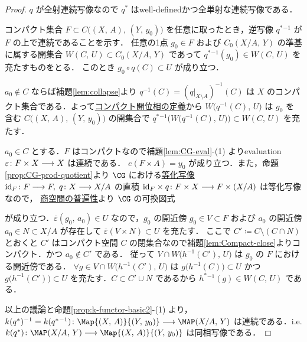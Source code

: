 \documentclass[algtopo_main]{subfiles}
\begin{document}
\begin{proof}
    $q$ が全射連続写像なので $q^*$ はwell-definedかつ全単射な連続写像である．
    
    コンパクト集合 $F \subset C \bigl( (X,\, A),\, (Y,\, y_0) \bigr)$ を任意に取ったとき，逆写像 $q^*{}^{-1}$ が $F$ の上で連続であることを示す．
    任意の1点 $g_0 \in F$ および $C_0(X/A,\, Y)$ の準基に属する開集合 $W(C,\, U) \subset C_0(X/A,\, Y)$ であって $q^*{}^{-1}(g_0) \in W(C,\, U)$ を充たすものをとる．
    このとき $g_0 \circ q(C) \subset U$ が成り立つ．
    
    $a_0 \notin C$ ならば補題\ref{lem:collapse}より $q^{-1}(C) = (q|_{X \setminus A})^{-1}(C)$ は $X$ のコンパクト集合である．よって\hyperref[def:compact-open]{コンパクト開位相の定義}から $W \bigl( q^{-1}(C),\, U \bigr)$ は $g_0$ を含む $C \bigl( (X,\, A),\, (Y,\, y_0) \bigr) $ の開集合で
    $q^*{}^{-1} \bigl( W \bigl( q^{-1}(C),\, U \bigr) \bigr) \subset W(C,\, U)$ を充たす．

    $a_0 \in C$ とする．$F$ はコンパクトなので補題\ref{lem:CG-eval}-(1) よりevaluation $\varepsilon \colon F \times X \longrightarrow X$ は連続である．
    $e(F \times A) = y_0$ が成り立つ．また，命題\ref{prop:CG-prod-quotient}より $\CG$ における\hyperref[def:quotient-map]{等化写像} $\mathrm{id}_F \colon F \longrightarrow F,\; q \colon X \longrightarrow X/A$ の直積 $\mathrm{id}_F \times q \colon F \times X \longrightarrow F \times (X/A)$ は等化写像なので，
    \hyperref[col:univ-quotient]{商空間の普遍性}より $\CG$ の可換図式
    \begin{center}
    \end{center}
    が成り立つ．$\overline{\varepsilon}(g_0,\, a_0) \in U$ なので，$g_0$ の開近傍 $g_0 \in V \subset F$ および $a_0$ の開近傍 $a_0 \in N \subset X/A$ が存在して $\overline{\varepsilon} (V \times N) \subset U$ を充たす．
    ここで $C' \coloneqq C \setminus (C \cap N)$ とおくと $C'$ はコンパクト空間 $C$ の閉集合なので補題\ref{lem:Compact-close}よりコンパクト．かつ $a_0 \notin C'$ である．
    従って $V \cap W \bigl( h^{-1}(C'),\, U \bigr)$ は $g_0$ の $F$ における開近傍である．
    $\forall g \in V \cap W \bigl( h^{-1}(C'),\, U \bigr)$ は $g \bigl(h^{-1}(C)\bigr) \subset U$ かつ $g \bigl( h^{-1}(C') \bigr) \subset U$ を充たす．$C \subset C' \cup N$ であるから $h^*{}^{-1}(g) \in W(C,\, U)$ である．

    以上の議論と命題\ref{prop:k-functor-basic2}-(1) より，$k(q^*)^{-1} = k(q^*{}^{-1}) \colon \Map{(X,\, A)}{(Y,\, y_0)} \lto \MAP (X/A,\, Y)$ は連続である．i.e. $k(q^*) \colon \MAP(X/A,\, Y) \lto \Map{(X,\, A)}{(Y,\, y_0)}$ は同相写像である．
\end{proof}
\end{document}
